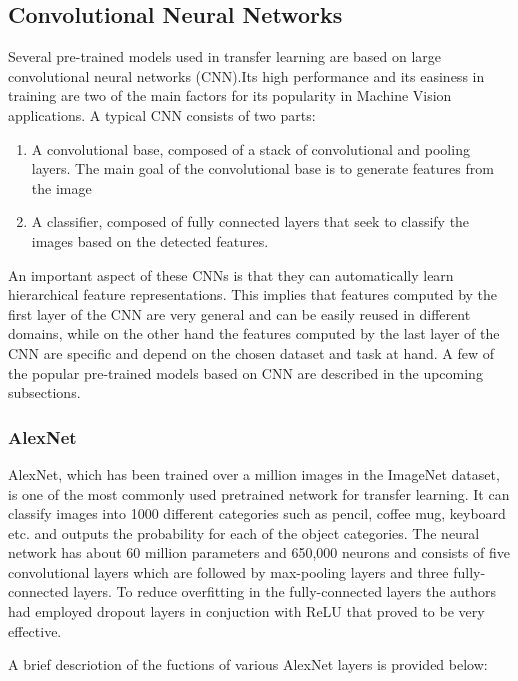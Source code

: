 \documentclass[doc/report.tex]{subfiles}
\begin{document}
\subsection{Convolutional Neural Networks}
Several pre-trained models used in transfer learning are based on large convolutional neural networks (CNN).Its high performance and its easiness in training are two of the main factors for its popularity in Machine Vision applications.
A typical CNN consists of two parts:
\begin{enumerate}
	\item A convolutional base, composed of a stack of convolutional and pooling layers. The main goal of the convolutional base is to generate features from the image
	\item A classifier, composed of fully connected layers that seek to classify the images based on the detected features.
\end{enumerate}
An important aspect of these CNNs is that they can automatically learn hierarchical feature representations. This implies that features computed by the first layer of the CNN are very general and can be easily reused in different domains, while on the other hand the features computed by the last layer of the CNN are specific and depend on the chosen dataset and task at hand. A few of the popular pre-trained models based on CNN are described in the upcoming subsections.

\subsubsection{AlexNet}
AlexNet\cite{Alex}, which has been trained over a million images in the
ImageNet dataset, is one of the most commonly used pretrained network for
transfer learning. It can classify images into 1000 different categories such
as pencil, coffee mug, keyboard etc. and outputs the probability for each of
the object categories. The neural network has about 60 million parameters and
650,000 neurons and consists of five convolutional layers which are followed by
max-pooling layers and three fully-connected layers. To reduce overfitting in
the fully-connected layers the authors had  employed dropout layers in
conjuction with ReLU that proved to be very effective.

A brief descriotion of the fuctions of various AlexNet layers is provided
below:
\end{document}
